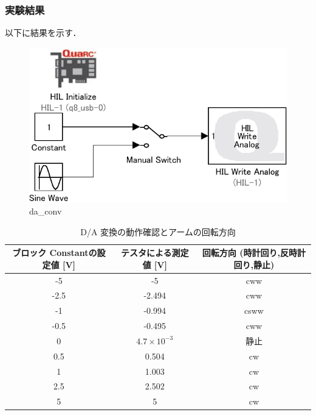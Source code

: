 \subsubsection{実験結果}
以下に結果を示す．

\begin{figure}[h]
  \centering
  \includegraphics[scale=1]{sozai/da_conv-crop.pdf}
  \caption{da\_conv}
\end{figure}

\newpage

\begin{table}[h]
  \centering
  \caption{D/A 変換の動作確認とアームの回転方向}
  \begin{tabular}{|c|c|c|}
    \hline
    ブロック Constantの設定値 [V] & テスタによる測定値 [V] & 回転方向 (時計回り,反時計回り,静止) \\ \hline
    -5                            & -5                     & cww                                 \\ \hline
    -2.5                          & -2.494                 & cww                                 \\ \hline
    -1                            & -0.994                 & csww                                \\ \hline
    -0.5                          & -0.495                 & cww                                 \\ \hline
    0                             & \(4.7×10^{-3}\)        & 静止                                \\ \hline
    0.5                           & 0.504                  & cw                                  \\ \hline
    1                             & 1.003                  & cw                                  \\ \hline
    2.5                           & 2.502                  & cw                                  \\ \hline
    5                             & 5                      & cw                                  \\ \hline
  \end{tabular}
\end{table}

